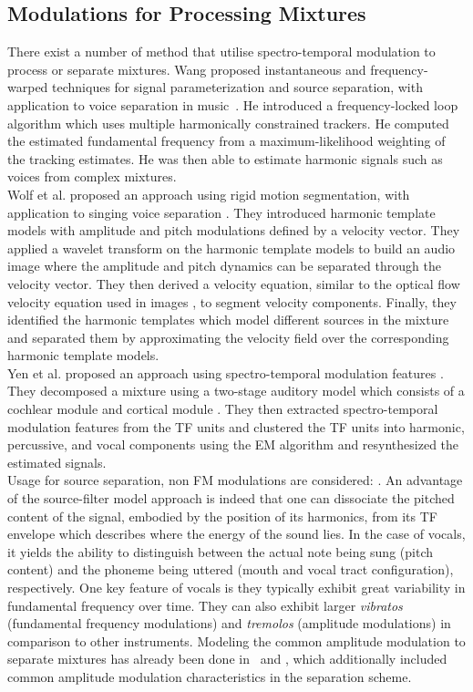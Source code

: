 \subsection{Modulations for Processing Mixtures}
There exist a number of method that utilise spectro-temporal modulation to process or separate mixtures.
Wang proposed instantaneous and frequency-warped techniques for signal parameterization and source separation, with application to voice separation in music~\cite{wang94,wang95}.
He introduced a frequency-locked loop algorithm which uses multiple harmonically constrained trackers.
He computed the estimated fundamental frequency from a maximum-likelihood weighting of the tracking estimates. He was then able to estimate harmonic signals such as voices from complex mixtures.\\
Wolf et al. proposed an approach using rigid motion segmentation, with application to singing voice separation \cite{wolf14,wolf16}. They introduced harmonic template models with amplitude and pitch modulations defined by a velocity vector. They applied a wavelet transform \cite{anden14} on the harmonic template models to build an audio image where the amplitude and pitch dynamics can be separated through the velocity vector. They then derived a velocity equation, similar to the optical flow velocity equation used in images \cite{bernard01}, to segment velocity components. Finally, they identified the harmonic templates which model different sources in the mixture and separated them by approximating the velocity field over the corresponding harmonic template models.\\
Yen et al. proposed an approach using spectro-temporal modulation features \cite{yen14,yen15}. They decomposed a mixture using a two-stage auditory model which consists of a cochlear module \cite{chi05} and cortical module \cite{chi99}. They then extracted spectro-temporal modulation features from the TF units and clustered the TF units into harmonic, percussive, and vocal components using the EM algorithm and resynthesized the estimated signals.\\
Usage for source separation, non FM modulations are considered: \cite{hennequin10}.
An advantage of the source-filter model approach is indeed that one can dissociate the pitched content of the signal, embodied by the position of its harmonics, from its TF envelope which describes where the energy of the sound lies. In the case of vocals, it yields the ability to distinguish between the actual note being sung (pitch content) and the phoneme being uttered (mouth and vocal tract configuration), respectively. One key feature of vocals is they typically exhibit great variability in fundamental frequency over time. They can also exhibit larger \textit{vibratos} (fundamental frequency modulations) and \textit{tremolos} (amplitude modulations) in comparison to other instruments.
Modeling the common amplitude modulation to separate mixtures has already been done in~\cite{li07} and
\cite{cano14}, which additionally included common amplitude modulation characteristics in the separation scheme.

